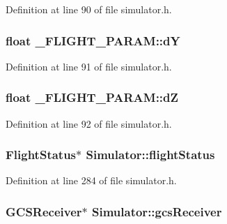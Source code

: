 \-Definition at line 90 of file simulator.\-h.

\hypertarget{group___h_i_t_l_plugin_ga759dc6a87e18b4ee9e44c2ab66ba767f}{
\subsubsection[{d\-Y}]{\setlength{\rightskip}{0pt plus 5cm}float {\bf \-\_\-\-F\-L\-I\-G\-H\-T\-\_\-\-P\-A\-R\-A\-M\-::d\-Y}}}\label{group___h_i_t_l_plugin_ga759dc6a87e18b4ee9e44c2ab66ba767f}


\-Definition at line 91 of file simulator.\-h.

\hypertarget{group___h_i_t_l_plugin_gade2afe2cbfb8e8fe0f8d7d97e0e62076}{
\subsubsection[{d\-Z}]{\setlength{\rightskip}{0pt plus 5cm}float {\bf \-\_\-\-F\-L\-I\-G\-H\-T\-\_\-\-P\-A\-R\-A\-M\-::d\-Z}}}\label{group___h_i_t_l_plugin_gade2afe2cbfb8e8fe0f8d7d97e0e62076}


\-Definition at line 92 of file simulator.\-h.

\hypertarget{group___h_i_t_l_plugin_ga2c3a29dc6471574d7182db7691e69a56}{
\subsubsection[{flight\-Status}]{\setlength{\rightskip}{0pt plus 5cm}\-Flight\-Status$\ast$ {\bf \-Simulator\-::flight\-Status}}}\label{group___h_i_t_l_plugin_ga2c3a29dc6471574d7182db7691e69a56}


\-Definition at line 284 of file simulator.\-h.

\hypertarget{group___h_i_t_l_plugin_gac63d17091bc4377e1b49696355a0ae19}{
\subsubsection[{gcs\-Receiver}]{\setlength{\rightskip}{0pt plus 5cm}\-G\-C\-S\-Receiver$\ast$ {\bf \-Simulator\-::gcs\-Receiver}}}\label{group___h_i_t_l_plugin_gac63d17091bc4377e1b49696355a0ae19}


